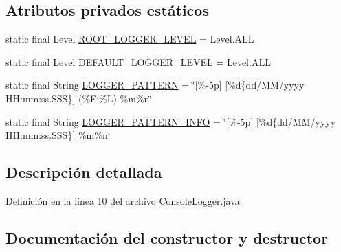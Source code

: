 \subsection*{Atributos privados estáticos}
\begin{DoxyCompactItemize}
\item 
static final Level \mbox{\hyperlink{classcom_1_1ruralhousejsf_1_1logger_1_1_console_logger_ae460ea729626c8bac117b5d2e27913fa}{R\+O\+O\+T\+\_\+\+L\+O\+G\+G\+E\+R\+\_\+\+L\+E\+V\+EL}} = Level.\+A\+LL
\item 
static final Level \mbox{\hyperlink{classcom_1_1ruralhousejsf_1_1logger_1_1_console_logger_ae0220e0b1c6452568125f7f1285627be}{D\+E\+F\+A\+U\+L\+T\+\_\+\+L\+O\+G\+G\+E\+R\+\_\+\+L\+E\+V\+EL}} = Level.\+A\+LL
\item 
static final String \mbox{\hyperlink{classcom_1_1ruralhousejsf_1_1logger_1_1_console_logger_a7ea77718b8e1412c1d637c7a5ae4e7c0}{L\+O\+G\+G\+E\+R\+\_\+\+P\+A\+T\+T\+E\+RN}} = \char`\"{}\mbox{[}\%-\/5p\mbox{]} \mbox{[}\%d\{dd/\+M\+M/yyyy H\+H\+:mm\+:ss.\+S\+S\+S\}\mbox{]} (\%\+F\+:\%\+L) \%m\%n\char`\"{}
\item 
static final String \mbox{\hyperlink{classcom_1_1ruralhousejsf_1_1logger_1_1_console_logger_a098472007554045743104c7534609e02}{L\+O\+G\+G\+E\+R\+\_\+\+P\+A\+T\+T\+E\+R\+N\+\_\+\+I\+N\+FO}} = \char`\"{}\mbox{[}\%-\/5p\mbox{]} \mbox{[}\%d\{dd/\+M\+M/yyyy H\+H\+:mm\+:ss.\+S\+S\+S\}\mbox{]} \%m\%n\char`\"{}
\end{DoxyCompactItemize}


\subsection{Descripción detallada}


Definición en la línea 10 del archivo Console\+Logger.\+java.



\subsection{Documentación del constructor y destructor}
\mbox{\label{classcom_1_1ruralhousejsf_1_1logger_1_1_console_logger_a51a46eb118739bc4e500b3f257ca170e}} 
